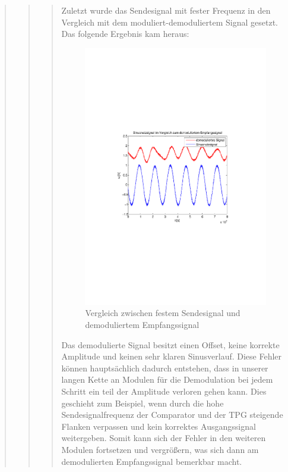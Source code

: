 \begin{quote}
\begin{quote}
\begin{quote}
          Zuletzt wurde das Sendesignal mit fester Frequenz in den Vergleich mit
          dem moduliert-demoduliertem Signal gesetzt. Das folgende Ergebnis kam
          heraus:
          
           
             \begin{figure}[H] \centering
                    \includegraphics[scale=0.5, trim = 2cm 6.5cm 1.5cm 8.5cm,
                    clip]{./Bilder/sinus_fm_demod}
                        \caption{Vergleich zwischen festem Sendesignal und
                        demoduliertem Empfangssignal}
                \end{figure}
          
        Das demodulierte Signal besitzt einen Offset, keine korrekte Amplitude 
        und keinen sehr klaren Sinusverlauf. Diese Fehler können hauptsächlich
        dadurch entstehen, dass in unserer langen Kette an Modulen für die
        Demodulation bei jedem Schritt ein teil der Amplitude verloren gehen
        kann. Dies geschieht zum Beispiel, wenn durch die hohe
        Sendesignalfrequenz der Comparator und der TPG steigende Flanken
        verpassen und kein korrektes Ausgangssignal weitergeben. Somit kann sich
        der Fehler in den weiteren Modulen fortsetzen und vergrößern, was sich
        dann am demodulierten Empfangssignal bemerkbar macht.\\
               

\end{quote}
\end{quote}
\end{quote}
